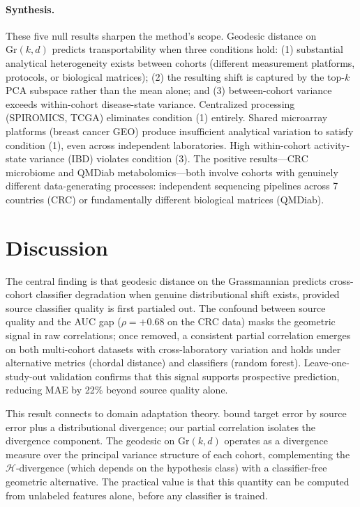 \documentclass{article}
\begin{document}
\paragraph{Synthesis.} These five null results sharpen the method's scope. Geodesic distance on $\mathrm{Gr}(k,d)$ predicts transportability when three conditions hold: (1) substantial analytical heterogeneity exists between cohorts (different measurement platforms, protocols, or biological matrices); (2) the resulting shift is captured by the top-$k$ PCA subspace rather than the mean alone; and (3) between-cohort variance exceeds within-cohort disease-state variance. Centralized processing (SPIROMICS, TCGA) eliminates condition (1) entirely. Shared microarray platforms (breast cancer GEO) produce insufficient analytical variation to satisfy condition (1), even across independent laboratories. High within-cohort activity-state variance (IBD) violates condition (3). The positive results---CRC microbiome and QMDiab metabolomics---both involve cohorts with genuinely different data-generating processes: independent sequencing pipelines across 7 countries (CRC) or fundamentally different biological matrices (QMDiab).


\section{Discussion}
\label{sec:discussion}

The central finding is that geodesic distance on the Grassmannian predicts cross-cohort classifier degradation when genuine distributional shift exists, provided source classifier quality is first partialed out. The confound between source quality and the AUC gap ($\rho = +0.68$ on the CRC data) masks the geometric signal in raw correlations; once removed, a consistent partial correlation emerges on both multi-cohort datasets with cross-laboratory variation and holds under alternative metrics (chordal distance) and classifiers (random forest). Leave-one-study-out validation confirms that this signal supports prospective prediction, reducing MAE by 22\% beyond source quality alone.

This result connects to domain adaptation theory. \citet{bendavid2010theory} bound target error by source error plus a distributional divergence; our partial correlation isolates the divergence component. The geodesic on $\mathrm{Gr}(k, d)$ operates as a divergence measure over the principal variance structure of each cohort, complementing the $\mathcal{H}$-divergence (which depends on the hypothesis class) with a classifier-free geometric alternative. The practical value is that this quantity can be computed from unlabeled features alone, before any classifier is trained.
\end{document}
